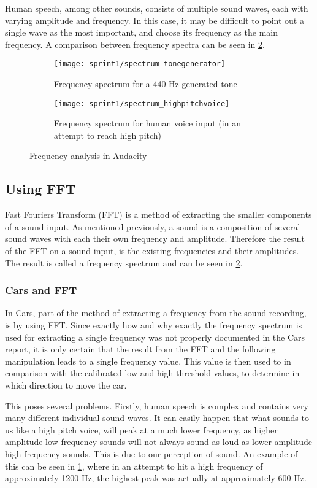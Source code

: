 Human speech, among other sounds, consists of multiple sound waves, each with varying amplitude and frequency.
In this case, it may be difficult to point out a single wave as the most important, and choose its frequency as the main frequency.
A comparison between frequency spectra can be seen in \cref{fig:frequency_spectra}.

\begin{figure}[h]
\centering
\begin{subfigure}[t]{.45\textwidth}
\texttt{[image: sprint1/spectrum\_tonegenerator]}
\caption{Frequency spectrum for a 440 Hz generated tone}
\end{subfigure}
\begin{subfigure}[t]{.45\textwidth}
\texttt{[image: sprint1/spectrum\_highpitchvoice]}
\caption{Frequency spectrum for human voice input (in an attempt to reach high pitch)}
\label{fig:humanvoice_spectra}
\end{subfigure}
\caption{Frequency analysis in Audacity}
\label{fig:frequency_spectra}
\end{figure}

\subsection{Using FFT}
Fast Fouriers Transform (FFT) is a method of extracting the smaller components of a sound input.
As mentioned previously, a sound is a composition of several sound waves with each their own frequency and amplitude.
Therefore the result of the FFT on a sound input, is the existing frequencies and their amplitudes.
The result is called a frequency spectrum and can be seen in \cref{fig:frequency_spectra}.

\subsubsection{Cars and FFT}
In Cars, part of the method of extracting a frequency from the sound recording, is by using FFT.
Since exactly how and why exactly the frequency spectrum is used for extracting a single frequency was not properly documented in the Cars report, it is only certain that the result from the FFT and the following manipulation leads to a single frequency value.
This value is then used to in comparison with the calibrated low and high threshold values, to determine in which direction to move the car.

This poses several problems.
Firstly, human speech is complex and contains very many different individual sound waves.
It can easily happen that what sounds to us like a high pitch voice, will peak at a much lower frequency, as higher amplitude low frequency sounds will not always sound as loud as lower amplitude high frequency sounds.
This is due to our perception of sound.
An example of this can be seen in \cref{fig:humanvoice_spectra}, where in an attempt to hit a high frequency of approximately 1200 Hz, the highest peak was actually at approximately 600 Hz.


